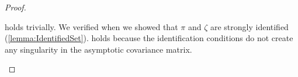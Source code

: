 \documentclass[11pt, letterpaper, twoside, final]{article}
\begin{document}
\begin{appendices}
\begin{proof}
\begin{proofpart}
    \label{mainTheoremProofPart4}
   
     holds trivially.
    We verified  when we showed that $\pi$ and $\zeta$ are strongly identified
    (\cref{lemma:IdentifiedSet}).
     holds because the identification conditions do not create any singularity in the
    asymptotic covariance matrix. 

\end{proofpart}

\end{proof}





\end{appendices}
\end{document}
